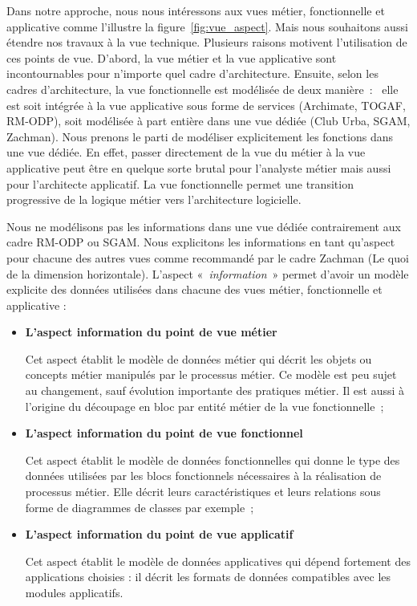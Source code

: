 Dans notre approche, nous nous intéressons aux vues métier, fonctionnelle et applicative comme l'illustre la figure~\ref{fig:vue_aspect}. Mais nous souhaitons aussi étendre nos travaux à la vue technique. 
Plusieurs raisons motivent l'utilisation de ces points de vue. D'abord, la vue métier et la vue applicative sont incontournables pour n'importe quel cadre d'architecture. Ensuite, selon les cadres d'architecture, la vue fonctionnelle est modélisée de deux manière~:~ elle est soit intégrée à la vue applicative sous forme de services (Archimate, TOGAF, RM-ODP), soit modélisée à part entière dans une vue dédiée (Club Urba, SGAM, Zachman). Nous prenons le parti de modéliser explicitement les fonctions dans une vue dédiée. En effet, passer directement de la vue du métier à la vue applicative peut être en quelque sorte brutal pour l'analyste métier mais aussi pour l'architecte applicatif. La vue fonctionnelle permet une transition progressive de la logique métier vers l'architecture logicielle.

Nous ne modélisons pas les informations dans une vue dédiée contrairement aux cadre RM-ODP ou SGAM. Nous explicitons les informations en tant qu'aspect pour chacune des autres vues comme recommandé par le cadre Zachman (Le quoi de la dimension horizontale). L'aspect «~\textit{information}~» permet d'avoir un modèle explicite des données utilisées dans chacune des vues métier, fonctionnelle et applicative :
	\begin{itemize}
	\item \textbf{L'aspect information du point de vue métier}
	
	Cet aspect établit le modèle de données métier qui  décrit les objets ou concepts métier manipulés par le processus métier. Ce modèle est peu sujet au changement, sauf évolution importante des pratiques métier. Il est aussi à l'origine du découpage en bloc par entité métier de la vue fonctionnelle~;
	\item \textbf{L'aspect information du point de vue fonctionnel}
	
	Cet aspect établit le modèle de données fonctionnelles qui donne le type des données utilisées par les blocs fonctionnels nécessaires à la réalisation de processus métier. Elle décrit leurs caractéristiques et leurs relations sous forme de diagrammes de classes par exemple~;
	
	\item \textbf{L'aspect information du point de vue applicatif} 
	
	Cet aspect établit le modèle de données applicatives qui dépend fortement des applications choisies : il décrit les formats de données compatibles avec les modules applicatifs.
	\end{itemize}
	
